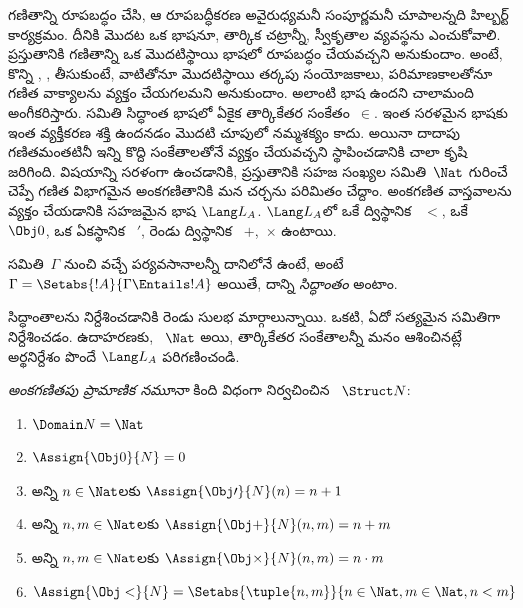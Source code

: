 \documentclass[../../../include/open-logic-section]{subfiles}
\begin{document}


గణితాన్ని రూపబద్ధం చేసి, ఆ రూపబద్ధీకరణ అవైరుధ్యమనీ సంపూర్ణమనీ చూపాలన్నది
హిల్బర్ట్ కార్యక్రమం. దీనికి మొదట ఒక భాషనూ, తార్కిక చట్రాన్నీ, స్వీకృతాల
వ్యవస్థను ఎంచుకోవాలి. ప్రస్తుతానికి గణితాన్ని ఒక మొదటిస్థాయి భాషలో
రూపబద్ధం చేయవచ్చని అనుకుందాం. అంటే, కొన్ని ,
, 
తీసుకుంటే, వాటితోనూ మొదటిస్థాయి తర్కపు సంయోజకాలు, పరిమాణకాలతోనూ గణిత
వాక్యాలను వ్యక్తం చేయగలమని అనుకుందాం. అలాంటి భాష ఉందని
చాలామంది అంగీకరిస్తారు. సమితి సిద్ధాంత భాషలో ఏకైక తార్కికేతర సంకేతం~$\in$.
ఇంత సరళమైన భాషకు ఇంత వ్యక్తీకరణ శక్తి ఉందనడం మొదటి చూపులో
నమ్మశక్యం కాదు. అయినా దాదాపు గణితమంతటినీ ఇన్ని కొద్ది సంకేతాలతోనే
వ్యక్తం చేయవచ్చని స్థాపించడానికి చాలా కృషి జరిగింది. విషయాన్ని సరళంగా ఉంచడానికి,
ప్రస్తుతానికి సహజ సంఖ్యల సమితి~$\Nat$ గురించే చెప్పే గణిత విభాగమైన అంకగణితానికి
మన చర్చను పరిమితం చేద్దాం. అంకగణిత వాస్తవాలను వ్యక్తం చేయడానికి సహజమైన భాష
$\Lang L_A$. $\Lang L_A$లో ఒకే ద్విస్థానిక ~$<$,
ఒకే ~$\Obj 0$, ఒక ఏకస్థానిక
~$\prime$, రెండు ద్విస్థానిక
~$+$,~$\times$ ఉంటాయి.

\begin{defn}
 సమితి~$\Gamma$ నుంచి వచ్చే పర్యవసానాలన్నీ
దానిలోనే ఉంటే, అంటే $\Gamma = \Setabs{!A}{\Gamma \Entails !A}$ అయితే,
దాన్ని \emph{సిద్ధాంతం} అంటాం.
\end{defn}

సిద్ధాంతాలను నిర్దేశించడానికి రెండు సులభ మార్గాలున్నాయి. ఒకటి, ఏదో
 సత్యమైన 
సమితిగా నిర్దేశించడం. ఉదాహరణకు, ~$\Nat$
అయి, తార్కికేతర సంకేతాలన్నీ మనం ఆశించినట్లే అర్థనిర్దేశం పొందే $\Lang L_A$
 పరిగణించండి.

\begin{defn}
\emph{అంకగణితపు ప్రామాణిక నమూనా} కింది విధంగా నిర్వచించిన
~$\Struct N$:
\begin{enumerate}
\item $\Domain N = \Nat$
\item $\Assign{\Obj 0}{N} = 0$
\item అన్ని $n \in \Nat$లకు $\Assign{\Obj \prime}{N}(n) = n + 1$
\item అన్ని $n, m \in \Nat$లకు $\Assign{\Obj +}{N}(n, m) = n + m$
\item అన్ని $n, m \in \Nat$లకు $\Assign{\Obj \times}{N}(n, m) = n\cdot m$
\item $\Assign{\Obj <}{N} = \Setabs{\tuple{n, m}}{n \in \Nat, m \in
  \Nat, n < m}$
\end{enumerate}
\end{defn}
\end{document}
